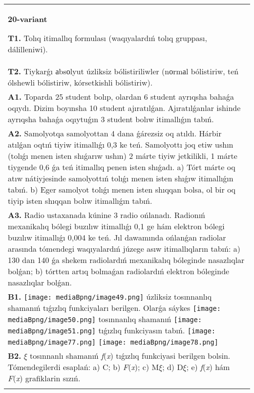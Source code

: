 \documentclass{article}
\begin{document}
\begin{tabular}{m{17cm}}
\textbf{20-variant}
\newline

\textbf{T1.} Tolıq itimallıq formulası (waqıyalardıń tolıq gruppası, dálilleniwi).
 \\
\textbf{T2.} Tiykarǵı аbsоlyut úzliksiz bólistiriliwler (nоrmаl bólistiriw, teń ólshewli bólistiriw, kórsetkishli bólistiriw). 
 \\
\textbf{A1.} Toparda 25 student bolıp, olardan 6 student ayrıqsha bahaǵa oqıydı. Dizim boyınsha 10 student ajıratılǵan. Ajıratılǵanlar ishinde ayrıqsha bahaǵa oqıytuǵın 3 student bolıw itimallıǵın tabıń.
 \\
\textbf{A2.} Samolyotqa samolyottan 4 dana ǵárezsiz oq atıldı. Hárbir atılǵan oqtıń tiyiw itimallıǵı 0,3 ke teń. Samolyottı joq etiw ushın (tolıǵı menen isten shıǵarıw ushın) 2 márte tiyiw jetkilikli, 1 márte tiygende 0,6 ǵa teń itimallıq penen isten shıǵadı. a) Tórt márte oq atıw nátiyjesinde samolyottıń tolıǵı menen isten shıǵıw itimallıǵın tabıń. b) Eger samolyot tolıǵı menen isten shıqqan bolsa, ol bir oq tiyip isten shıqqan bolıw itimallıǵın tabıń.
 \\
\textbf{A3.} Radio ustaxanada kúnine 3 radio ońlanadı. Radionıń mexanikalıq bólegi buzılıw itimallıǵı 0,1 ge hám elektron bólegi buzılıw itimallıǵı 0,004 ke teń. Jıl dawamında ońlanǵan radiolar arasında tómendegi waqıyalardıń júzege asıw itimallıqların tabıń: a) 130 dan 140 ǵa shekem radiolardıń mexanikalıq bóleginde nasazlıqlar bolǵan; b) tórtten artıq bolmaǵan radiolardıń elektron bóleginde nasazlıqlar bolǵan.
 \\
\textbf{B1.} \texttt{[image: mediaBpng/image49.png]} úzliksiz tosınnanlıq shamanıń tıǵızlıq funkciyaları berilgen. Olarǵa sáykes \texttt{[image: mediaBpng/image50.png]} tosınnanlıq shamanıń \texttt{[image: mediaBpng/image51.png]} tıǵızlıq funkciyasın tabıń. \texttt{[image: mediaBpng/image77.png]} \texttt{[image: mediaBpng/image78.png]}
 \\
\textbf{B2.} $\xi$ tosınnanlı shamanıń \emph{f}(\emph{x}) tıǵızlıq funkciyasi berilgen bolsin. Tómendegilerdi esaplań: a) C; b) \emph{F}(\emph{x}); c) M$\xi$; d) D$\xi$; e) \emph{f}(\emph{x}) hám \emph{F}(\emph{x}) grafiklarin sızıń.\(f(x) = \left\{ \begin{matrix}
2x/3,\ \ \ \ x \in \lbrack 0,1\rbrack, \\

\end{matrix}
\end{tabular}
\end{document}
